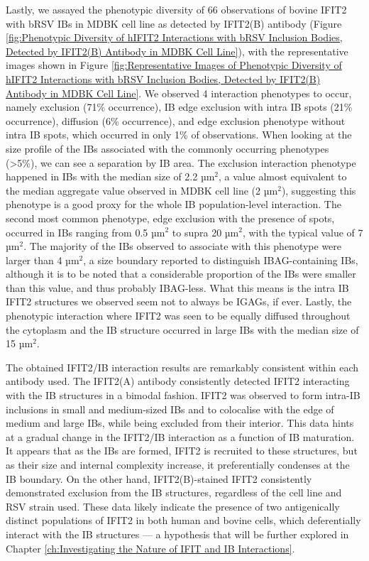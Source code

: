Lastly, we assayed the phenotypic diversity of 66 observations of bovine IFIT2 with bRSV IBs in MDBK cell line as detected by IFIT2(B) antibody (Figure \ref{fig:Phenotypic Diversity of hIFIT2 Interactions with bRSV Inclusion Bodies, Detected by IFIT2(B) Antibody in MDBK Cell Line}), with the representative images shown in Figure \ref{fig:Representative Images of Phenotypic Diversity of hIFIT2 Interactions with bRSV Inclusion Bodies, Detected by IFIT2(B) Antibody in MDBK Cell Line}. We observed 4 interaction phenotypes to occur, namely exclusion (71\% occurrence), IB edge exclusion with intra IB spots (21\% occurrence), diffusion (6\% occurrence), and edge exclusion phenotype without intra IB spots, which occurred in only 1\% of observations. When looking at the size profile of the IBs associated with the commonly occurring phenotypes (>5\%), we can see a separation by IB area. The exclusion interaction phenotype happened in IBs with the median size of 2.2 \(\mbox{µm}^2\), a value almost equivalent to the median aggregate value observed in MDBK cell line (2 \(\mbox{µm}^2\)), suggesting this phenotype is a good proxy for the whole IB population-level interaction. The second most common phenotype, edge exclusion with the presence of spots, occurred in IBs ranging from 0.5 \(\mbox{µm}^2\) to supra 20 \(\mbox{µm}^2\), with the typical value of 7 \(\mbox{µm}^2\). The majority of the IBs observed to associate with this phenotype were larger than 4 \(\mbox{µm}^2\), a size boundary reported to distinguish IBAG-containing IBs, although it is to be noted that a considerable proportion of the IBs were smaller than this value, and thus probably IBAG-less. What this means is the intra IB IFIT2 structures we observed seem not to always be IGAGs, if ever. Lastly, the phenotypic interaction where IFIT2 was seen to be equally diffused throughout the cytoplasm and the IB structure occurred in large IBs with the median size of 15 \(\mbox{µm}^2\).

The obtained IFIT2/IB interaction results are remarkably consistent within each antibody used. The IFIT2(A) antibody consistently detected IFIT2 interacting with the IB structures in a bimodal fashion. IFIT2 was observed to form intra-IB inclusions in small and medium-sized IBs and to colocalise with the edge of medium and large IBs, while being excluded from their interior. This data hints at a gradual change in the IFIT2/IB interaction as a function of IB maturation. It appears that as the IBs are formed, IFIT2 is recruited to these structures, but as their size and internal complexity increase, it preferentially condenses at the IB boundary. On the other hand, IFIT2(B)-stained IFIT2 consistently demonstrated exclusion from the IB structures, regardless of the cell line and RSV strain used. These data likely indicate the presence of two antigenically distinct populations of IFIT2 in both human and bovine cells, which deferentially interact with the IB structures — a hypothesis that will be further explored in Chapter \ref{ch:Investigating the Nature of IFIT and IB Interactions}.

